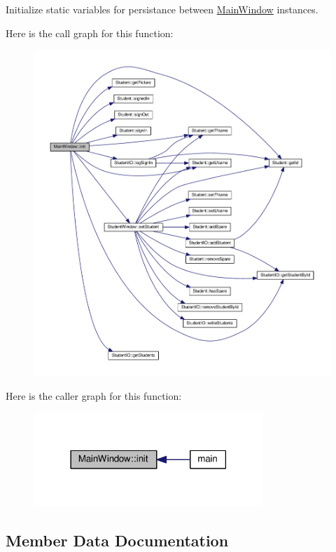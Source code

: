 Initialize static variables for persistance between \hyperlink{class_main_window}{Main\+Window} instances. 

Here is the call graph for this function\+:
\nopagebreak
\begin{figure}[H]
\begin{center}
\leavevmode
\includegraphics[width=350pt]{class_main_window_a671e7e5b0a3a7a3fb1cf44c5c8377952_cgraph}
\end{center}
\end{figure}
Here is the caller graph for this function\+:
\nopagebreak
\begin{figure}[H]
\begin{center}
\leavevmode
\includegraphics[width=246pt]{class_main_window_a671e7e5b0a3a7a3fb1cf44c5c8377952_icgraph}
\end{center}
\end{figure}


\subsection{Member Data Documentation}
\mbox{\label{class_main_window_a56d4e25cc4671e1e91159108ce7f0236}} 
